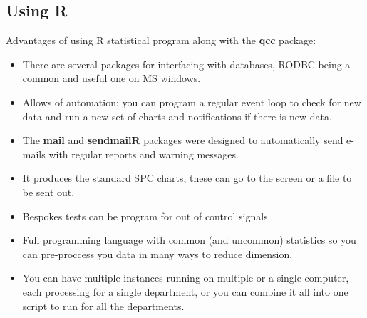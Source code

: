 \documentclass[]{article}
\begin{document}
\subsection{Using R}
{
\large
Advantages of using R statistical program along with the \textbf{qcc} package:
\begin{itemize}
\item There are several packages for interfacing with databases, RODBC being a common and useful one on MS windows.
\item Allows of automation: you can program a regular event loop to check for new data and run a new set of charts and notifications if there is new data.
\item The \textbf{mail} and \textbf{sendmailR} packages were designed to automatically send e-mails with regular reports and warning messages.
\item It produces the standard SPC charts, these can go to the screen or a file to be sent out.
\item Bespokes tests can be program for out of control signals
\item Full programming language with common (and uncommon) statistics so you can pre-proccess you data in many ways to reduce dimension.
\item You can have multiple instances running on multiple or a single computer, each processing for a single department, or you can combine it all into one script to run for all the departments.
\end{itemize}
}
\newpage
\end{document}
